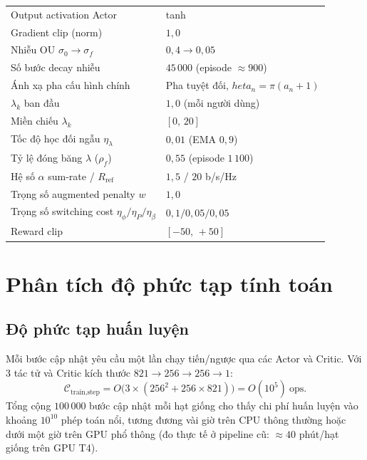 \begin{table}[t]
\begin{tabular}{p{5.5cm} l}
Output activation Actor             & tanh \\
Gradient clip (norm)                & $1{,}0$ \\
Nhiễu OU $\sigma_0 \to \sigma_f$    & $0{,}4 \to 0{,}05$ \\
Số bước decay nhiễu                 & $45\,000$ (episode $\approx 900$) \\
Ánh xạ pha cấu hình chính          & Pha tuyệt đối, $	heta_n=\pi(a_n+1)$ \\
$\lambda_k$ ban đầu                 & $1{,}0$ (mỗi người dùng) \\
Miền chiếu $\lambda_k$              & $[0,\, 20]$ \\
Tốc độ học đối ngẫu $\eta_{\lambda}$ & $0{,}01$ (EMA $0{,}9$) \\
Tỷ lệ đóng băng $\lambda$ ($\rho_f$) & $0{,}55$ (episode $1\,100$) \\
Hệ số $\alpha$ sum-rate / $R_{\text{ref}}$ & $1{,}5$ / $20$ b/s/Hz \\
Trọng số augmented penalty $w$      & $1{,}0$ \\
Trọng số switching cost $\eta_{\phi}/\eta_{P}/\eta_{\beta}$ & $0{,}1 / 0{,}05 / 0{,}05$ \\
Reward clip                         & $[-50,\, +50]$ \\
\bottomrule
\end{tabular}
\end{table}

\section{Phân tích độ phức tạp tính toán}
\label{sec:complexity}

\subsection{Độ phức tạp huấn luyện}

Mỗi bước cập nhật yêu cầu một lần chạy tiến/ngược qua các Actor và Critic.
Với 3 tác tử và Critic kích thước $821 \to 256 \to 256 \to 1$:
\begin{equation}
\mathcal{C}_{\text{train,step}} = O\!\big(3 \times (256^2 + 256 \times 821)\big)
                                = O(10^5)\ \text{ops}.
\end{equation}
Tổng cộng $100\,000$ bước cập nhật mỗi hạt giống cho thấy chi phí huấn
luyện vào khoảng $10^{10}$ phép toán nổi, tương đương vài giờ trên CPU
thông thường hoặc dưới một giờ trên GPU phổ thông (đo thực tế ở pipeline
cũ: $\approx 40$ phút/hạt giống trên GPU T4).


